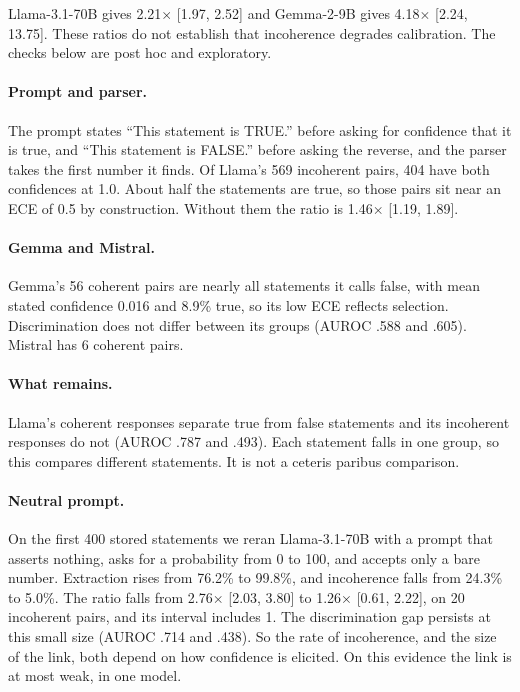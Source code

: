 Llama-3.1-70B gives 2.21$\times$ [1.97, 2.52] and Gemma-2-9B gives 4.18$\times$ [2.24, 13.75]. These ratios do not establish that incoherence degrades calibration. The checks below are post hoc and exploratory.

\paragraph{Prompt and parser.} The prompt states ``This statement is TRUE.'' before asking for confidence that it is true, and ``This statement is FALSE.'' before asking the reverse, and the parser takes the first number it finds. Of Llama's 569 incoherent pairs, 404 have both confidences at 1.0. About half the statements are true, so those pairs sit near an ECE of 0.5 by construction. Without them the ratio is 1.46$\times$ [1.19, 1.89].

\paragraph{Gemma and Mistral.} Gemma's 56 coherent pairs are nearly all statements it calls false, with mean stated confidence 0.016 and 8.9\% true, so its low ECE reflects selection. Discrimination does not differ between its groups (AUROC .588 and .605). Mistral has 6 coherent pairs.

\paragraph{What remains.} Llama's coherent responses separate true from false statements and its incoherent responses do not (AUROC .787 and .493). Each statement falls in one group, so this compares different statements. It is not a ceteris paribus comparison.

\paragraph{Neutral prompt.} On the first 400 stored statements we reran Llama-3.1-70B with a prompt that asserts nothing, asks for a probability from 0 to 100, and accepts only a bare number. Extraction rises from 76.2\% to 99.8\%, and incoherence falls from 24.3\% to 5.0\%. The ratio falls from 2.76$\times$ [2.03, 3.80] to 1.26$\times$ [0.61, 2.22], on 20 incoherent pairs, and its interval includes 1. The discrimination gap persists at this small size (AUROC .714 and .438). So the rate of incoherence, and the size of the link, both depend on how confidence is elicited. On this evidence the link is at most weak, in one model.

